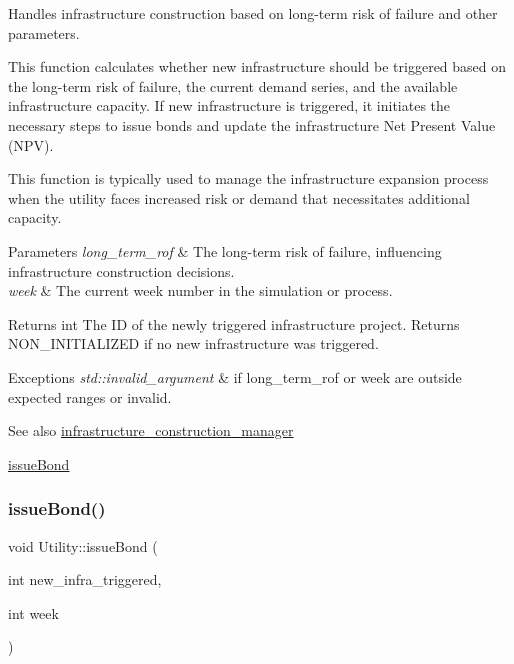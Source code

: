 Handles infrastructure construction based on long-\/term risk of failure and other parameters. 

This function calculates whether new infrastructure should be triggered based on the long-\/term risk of failure, the current demand series, and the available infrastructure capacity. If new infrastructure is triggered, it initiates the necessary steps to issue bonds and update the infrastructure Net Present Value (N\+PV).

This function is typically used to manage the infrastructure expansion process when the utility faces increased risk or demand that necessitates additional capacity.


\begin{DoxyParams}{Parameters}
{\em long\+\_\+term\+\_\+rof} & The long-\/term risk of failure, influencing infrastructure construction decisions.\\
\hline
{\em week} & The current week number in the simulation or process.\\
\hline
\end{DoxyParams}
\begin{DoxyReturn}{Returns}
int The ID of the newly triggered infrastructure project. Returns N\+O\+N\+\_\+\+I\+N\+I\+T\+I\+A\+L\+I\+Z\+ED if no new infrastructure was triggered.
\end{DoxyReturn}

\begin{DoxyExceptions}{Exceptions}
{\em std\+::invalid\+\_\+argument} & if long\+\_\+term\+\_\+rof or week are outside expected ranges or invalid.\\
\hline
\end{DoxyExceptions}
\begin{DoxySeeAlso}{See also}
\mbox{\hyperlink{classUtility_a2eff94831dd7a4b7a4243ef69c5311d9}{infrastructure\+\_\+construction\+\_\+manager}} 

\mbox{\hyperlink{classUtility_a152ceea2917ea7715e8fbf8aff24390f}{issue\+Bond}} 
\end{DoxySeeAlso}
\mbox{\label{classUtility_a152ceea2917ea7715e8fbf8aff24390f}} 
\subsubsection{\texorpdfstring{issue\+Bond()}{issueBond()}}
{\footnotesize\ttfamily void Utility\+::issue\+Bond (\begin{DoxyParamCaption}\item[{int}]{new\+\_\+infra\+\_\+triggered,  }\item[{int}]{week }\end{DoxyParamCaption})}




